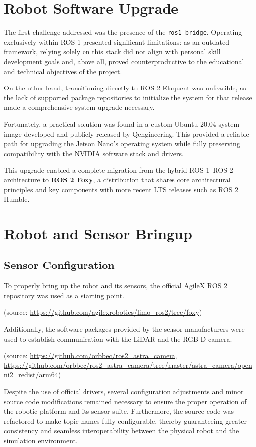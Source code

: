 \documentclass[a4paper,11pt,oneside]{book}
\begin{document}
\section{Robot Software Upgrade}
The first challenge addressed was the presence of the \texttt{ros1\_bridge}. Operating exclusively within ROS 1 presented significant limitations: as an outdated framework, relying solely on this stack did not align with personal skill development goals and, above all, proved counterproductive to the educational and technical objectives of the project. 

On the other hand, transitioning directly to ROS 2 Eloquent was unfeasible, as the lack of supported package repositories to initialize the system for that release made a comprehensive system upgrade necessary.

Fortunately, a practical solution was found in a custom Ubuntu 20.04 system image developed and publicly released by Qengineering. This provided a reliable path for upgrading the Jetson Nano's operating system while fully preserving compatibility with the NVIDIA software stack and drivers. 

This upgrade enabled a complete migration from the hybrid ROS 1--ROS 2 architecture to \textbf{ROS 2 Foxy}, a distribution that shares core architectural principles and key components with more recent LTS releases such as ROS 2 Humble.

\section{Robot and Sensor Bringup}

\subsection{Sensor Configuration}

To properly bring up the robot and its sensors, the official AgileX ROS 2 repository was used as a starting point.

(source: \url{https://github.com/agilexrobotics/limo_ros2/tree/foxy})

Additionally, the software packages provided by the sensor manufacturers were used to establish communication with the LiDAR and the RGB-D camera.

(source: \url{https://github.com/orbbec/ros2_astra_camera}, \url{https://github.com/orbbec/ros2_astra_camera/tree/master/astra_camera/openni2_redist/arm64})

Despite the use of official drivers, several configuration adjustments and minor source code modifications remained necessary to ensure the proper operation of the robotic platform and its sensor suite. Furthermore, the source code was refactored to make topic names fully configurable, thereby guaranteeing greater consistency and seamless interoperability between the physical robot and the simulation environment.
\end{document}
